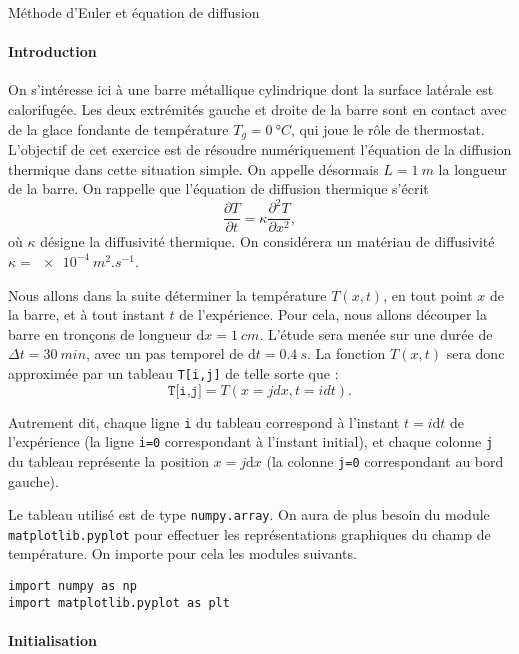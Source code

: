 \begin{exo}[3][python]{Méthode d'Euler et équation de diffusion}

  \paragraph{Introduction}
    On s'intéresse ici à une barre métallique cylindrique dont la surface latérale est calorifugée. Les deux extrémités gauche et droite de la barre sont en contact avec de la glace fondante de température $T_g = \SI{0}{\degree C}$, qui joue le rôle de thermostat.  L’objectif de cet exercice est de résoudre numériquement l’équation de la diffusion thermique dans cette situation simple. On appelle désormais $L=\SI{1}{m}$ la longueur de la barre. On rappelle que l'équation de diffusion thermique s'écrit
    $$
    \boxed{
    \frac{\partial T}{\partial t} = \kappa \frac{\partial^2 T}{\partial x^2},
    }
    $$
    où $\kappa$ désigne la diffusivité thermique. On considérera un matériau de diffusivité $\kappa=\SI{e-4}{m^2.s^{-1}}$.
    
    
    Nous allons dans la suite déterminer la température $T(x,t)$, en tout point $x$ de la barre,
     et à tout instant $t$ de l'expérience. Pour cela, nous allons découper la barre en tronçons de longueur $\mathrm{d} x=\SI{1}{cm}$.
    L'étude sera menée sur une durée de $\Delta t = \SI{30}{min}$, avec un pas temporel de $\mathrm{d} t=\SI{0,4}{s}$. La fonction $T(x,t)$ sera donc approximée par un tableau \texttt{T[i,j]} de telle sorte que :
    $$
    \boxed{
      \texttt{T[i,j]} = T(x=j dx,t=i dt).
    }$$
    
    Autrement dit, chaque ligne \texttt{i} du tableau correspond à l'instant $t=i\mathrm{d}t$ de l'expérience (la ligne \texttt{i=0} correspondant à l'instant initial), et chaque colonne \texttt{j} du tableau représente la position $x=j\mathrm{d}x$ (la colonne \texttt{j=0} correspondant au bord gauche).
    
    Le tableau utilisé est de type \texttt{numpy.array}. On aura de plus besoin du module \texttt{matplotlib.pyplot} pour effectuer les représentations graphiques du champ de température. On importe pour cela les modules suivants. 
\begin{verbatim}
import numpy as np
import matplotlib.pyplot as plt
\end{verbatim}
    
    \paragraph{Initialisation}
    \begin{questions}
      \item	
    

\end{questions}
\end{exo}
